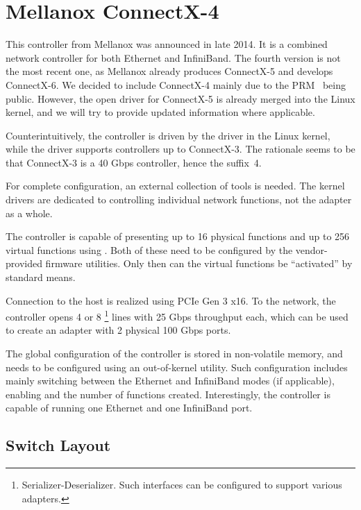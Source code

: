 \section{Mellanox ConnectX-4}

This controller from Mellanox was announced in late 2014. It is a combined
network controller for both Ethernet and InfiniBand. The fourth version is not
the most recent one, as Mellanox already produces ConnectX-5 and develops
ConnectX-6. We decided to include ConnectX-4 mainly due to the
\acrfull{PRM}~\cite{mlx-prm} being public. However, the open driver for
ConnectX-5 is already merged into the Linux kernel, and we will try to provide
updated information where applicable.

Counterintuitively, the controller is driven by the  driver in the
Linux kernel, while the  driver supports controllers up to ConnectX-3.
The rationale seems to be that ConnectX-3 is a 40 Gbps controller, hence the
suffix~4.

For complete configuration, an external collection of tools is needed. The
kernel drivers are dedicated to controlling individual network functions, not
the adapter as a whole.

The controller is capable of presenting up to 16 physical functions and up to
256 virtual functions using . Both of these need to be configured by
the vendor-provided firmware utilities. Only then can the virtual functions be
``activated'' by standard means.

Connection to the host is realized using PCIe Gen 3 x16. To the network, the
controller opens 4 or 8 \footnote{Serializer-Deserializer. Such
interfaces can be configured to support various  adapters.} lines with
25 Gbps throughput each, which
can be used to create an adapter with 2 physical 100 Gbps ports.

The global configuration of the controller is stored in non-volatile memory, and
needs to be configured using an out-of-kernel utility. Such configuration
includes mainly switching between the Ethernet and InfiniBand modes (if
applicable), enabling  and the number of functions created.
Interestingly, the controller is capable of running one Ethernet and one
InfiniBand port.

\subsection{Switch Layout}

